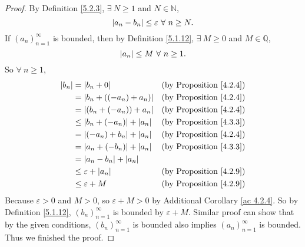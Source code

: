 \begin{proof}
By Definition \ref{5.2.3}, \(\exists\ N \geq 1\) and \(N \in \mathds{N}\),
\[
    \abs*{a_n - b_n} \leq \varepsilon \ \forall\ n \geq N.
\]
If \((a_n)_{n = 1}^{\infty}\) is bounded, then by Definition \ref{5.1.12}, \(\exists\ M \geq 0\) and \(M \in \mathds{Q}\),
\[
    \abs*{a_n} \leq M \ \forall\ n \geq 1.
\]
So \(\forall\ n \geq 1\),
\begin{align*}
\abs*{b_n} &= \abs*{b_n + 0} & \text{(by Proposition \ref{4.2.4})} \\
&= \abs*{b_n + ((-a_n) + a_n)} & \text{(by Proposition \ref{4.2.4})} \\
&= \abs*{(b_n + (-a_n)) + a_n} & \text{(by Proposition \ref{4.2.4})} \\
&\leq \abs*{b_n + (-a_n)} + \abs*{a_n} & \text{(by Proposition \ref{4.3.3})} \\
&= \abs*{(-a_n) + b_n} + \abs*{a_n} & \text{(by Proposition \ref{4.2.4})} \\
&= \abs*{a_n + (-b_n)} + \abs*{a_n} & \text{(by Proposition \ref{4.3.3})} \\
&= \abs*{a_n - b_n} + \abs*{a_n} \\
&\leq \varepsilon + \abs*{a_n} & \text{(by Proposition \ref{4.2.9})} \\
&\leq \varepsilon + M & \text{(by Proposition \ref{4.2.9})} \\
\end{align*}
Because \(\varepsilon > 0\) and \(M > 0\), so \(\varepsilon + M > 0\) by Additional Corollary \ref{ac 4.2.4}.
So by Definition \ref{5.1.12}, \((b_n)_{n = 1}^{\infty}\) is bounded by \(\varepsilon + M\).
Similar proof can show that by the given conditions, \((b_n)_{n = 1}^{\infty}\) is bounded also implies \((a_n)_{n = 1}^{\infty}\) is bounded.
Thus we finished the proof.
\end{proof}